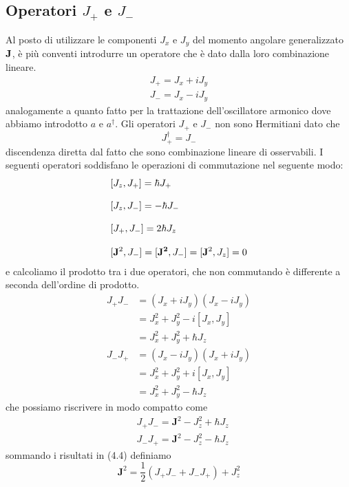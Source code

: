\subsection{Operatori $J_+$  e $J_{-}$}

Al posto di utilizzare le componenti $J_x$ e $J_y$ del momento angolare generalizzato $\bold{J}$, \`e pi\`u conventi introdurre un operatore che \`e dato dalla loro combinazione lineare.
\begin{align}
	J_+ = J_x + i J_y \\[0.3cm]
	J_- = J_x - i J_y
\end{align}
analogamente a quanto fatto per la trattazione dell'oscillatore armonico dove abbiamo introdotto $a$ e $a^\dag$. Gli operatori $J_{+}$ e $J_{-}$ non sono Hermitiani  dato che 
\begin{equation*}
	J_+^\dag = J_-
\end{equation*}
discendenza diretta dal fatto che sono combinazione lineare di osservabili. I seguenti operatori soddisfano le operazioni  di commutazione nel seguente modo:
\begin{align*}
& [J_z,J_+] = \hbar J_+ \\[0.3cm]
& [J_z,J_-] = - \hbar J_{-} \\[0.3cm]
& [J_+,J_-] = 2 \hbar J_{z} \\[0.3cm]
& [ \bold{J}^2,J_{-}] = [\bold{J^2},J_{-}] = [\bold{J}^2,J_z] = 0
\end{align*}
e calcoliamo il prodotto tra i due operatori, che non commutando \`e differente a seconda dell'ordine di prodotto.
\begin{equation}
\begin{aligned}
J_{+} J_{-} & =\left(J_x+i J_y\right)\left(J_x-i J_y\right) \\
& =J_x^2+J_y^2-i\left[J_x, J_y\right] \\
& =J_x^2+J_y^2+\hbar J_z \\
J_{-} J_{+} & =\left(J_x-i J_y\right)\left(J_x+i J_y\right) \\
& =J_x^2+J_y^2+i\left[J_x, J_y\right] \\
& =J_x^2+J_y^2-\hbar J_z
\end{aligned}
\end{equation}
che possiamo riscrivere in modo compatto come 
\begin{equation}
\begin{aligned}
& J_{+} J_{-}=\mathbf{J}^2-J_z^2+\hbar J_z \\
& J_{-} J_{+}=\mathbf{J}^2-J_z^2-\hbar J_z
\end{aligned}
\end{equation}
\newpage
sommando i risultati in (4.4) definiamo
\begin{equation*}
	\mathbf{J}^2=\frac{1}{2}\left(J_{+} J_{-}+J_{-} J_{+}\right)+J_z^2
\end{equation*}

